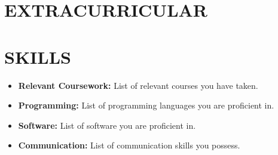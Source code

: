 \documentclass[9pt]{developercv} %
\begin{document}
\section*{EXTRACURRICULAR}



%

\section*{SKILLS}
\begin{itemize}
    \item \textbf{Relevant Coursework:} List of relevant courses you have taken. %
    \item \textbf{Programming:} List of programming languages you are proficient in. %
    \item \textbf{Software:} List of software you are proficient in. %
    \item \textbf{Communication:} List of communication skills you possess. %
\end{itemize}

\end{document}
